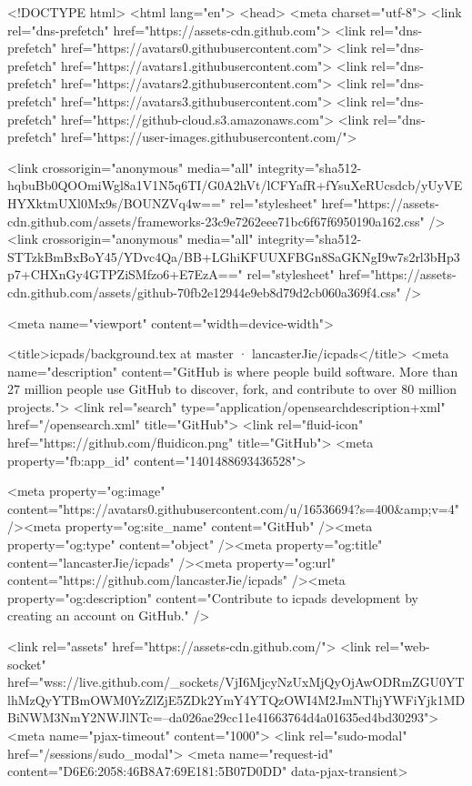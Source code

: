 





<!DOCTYPE html>
<html lang="en">
  <head>
    <meta charset="utf-8">
  <link rel="dns-prefetch" href="https://assets-cdn.github.com">
  <link rel="dns-prefetch" href="https://avatars0.githubusercontent.com">
  <link rel="dns-prefetch" href="https://avatars1.githubusercontent.com">
  <link rel="dns-prefetch" href="https://avatars2.githubusercontent.com">
  <link rel="dns-prefetch" href="https://avatars3.githubusercontent.com">
  <link rel="dns-prefetch" href="https://github-cloud.s3.amazonaws.com">
  <link rel="dns-prefetch" href="https://user-images.githubusercontent.com/">



  <link crossorigin="anonymous" media="all" integrity="sha512-hqbuBb0QOOmiWgl8a1V1N5q6TI/G0A2hVt/lCFYafR+fYsuXeRUcsdcb/yUyVEHYXktmUXl0Mx9s/BOUNZVq4w==" rel="stylesheet" href="https://assets-cdn.github.com/assets/frameworks-23c9e7262eee71bc6f67f6950190a162.css" />
  <link crossorigin="anonymous" media="all" integrity="sha512-STTzkBmBxBoY45/YDvc4Qa/BB+LGhiKFUUXFBGn8SaGKNgI9w7s2rl3bHp3p7+CHXnGy4GTPZiSMfzo6+E7EzA==" rel="stylesheet" href="https://assets-cdn.github.com/assets/github-70fb2e12944e9eb8d79d2cb060a369f4.css" />
  
  
  
  

  <meta name="viewport" content="width=device-width">
  
  <title>icpads/background.tex at master · lancasterJie/icpads</title>
    <meta name="description" content="GitHub is where people build software. More than 27 million people use GitHub to discover, fork, and contribute to over 80 million projects.">
    <link rel="search" type="application/opensearchdescription+xml" href="/opensearch.xml" title="GitHub">
  <link rel="fluid-icon" href="https://github.com/fluidicon.png" title="GitHub">
  <meta property="fb:app_id" content="1401488693436528">

    
    <meta property="og:image" content="https://avatars0.githubusercontent.com/u/16536694?s=400&amp;v=4" /><meta property="og:site_name" content="GitHub" /><meta property="og:type" content="object" /><meta property="og:title" content="lancasterJie/icpads" /><meta property="og:url" content="https://github.com/lancasterJie/icpads" /><meta property="og:description" content="Contribute to icpads development by creating an account on GitHub." />

  <link rel="assets" href="https://assets-cdn.github.com/">
  <link rel="web-socket" href="wss://live.github.com/_sockets/VjI6MjcyNzUxMjQyOjAwODRmZGU0YTlhMzQyYTBmOWM0YzZlZjE5ZDk2YmY4YTQzOWI4M2JmNThjYWFiYjk1MDBiNWM3NmY2NWJlNTc=--da026ae29cc11e41663764d4a01635ed4bd30293">
  <meta name="pjax-timeout" content="1000">
  <link rel="sudo-modal" href="/sessions/sudo_modal">
  <meta name="request-id" content="D6E6:2058:46B8A7:69E181:5B07D0DD" data-pjax-transient>


